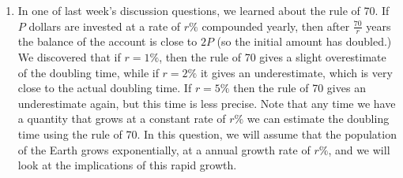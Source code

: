 \documentclass[11pt,dvipsnames]{article}
\begin{document}

\begin{enumerate}[label= {\bf  \arabic*:}]
\item In one of last week's discussion questions, we learned about the rule of 70. If $P$ dollars are invested at a rate of $r\%$ compounded yearly, then after $\displaystyle \frac{70}{r}$ years the balance of the account is close to $2P$ (so the initial amount has doubled.) We discovered that if $r=1\%$, then the rule of 70 gives a slight overestimate of the doubling time, while if $r=2\%$ it gives an underestimate, which is very close to the actual doubling time. If $r=5\%$ then the rule of 70 gives an underestimate again, but this time is less precise. Note that any time we have a quantity that grows at a constant rate of $r\%$ we can estimate the doubling time using the rule of 70. In this question, we will assume that the population of the Earth grows exponentially, at a annual growth rate of $r\%$, and we will look at the implications of this rapid growth.


\end{enumerate}
\end{document}
